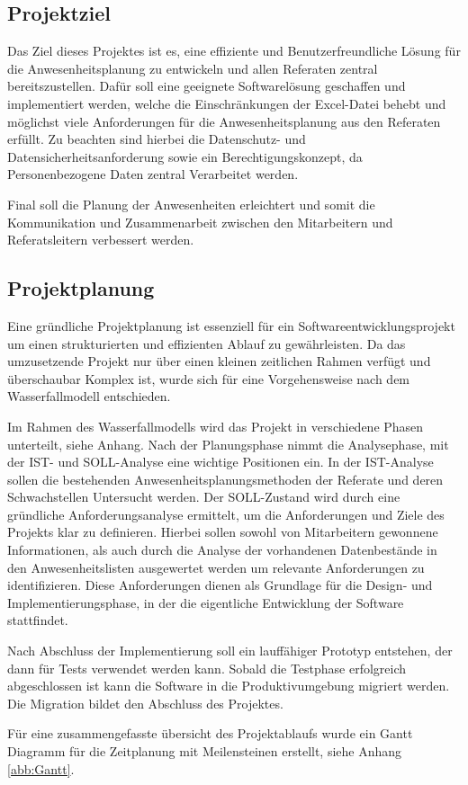 \subsection{Projektziel}
\label{sec:Projektziel}

Das Ziel dieses Projektes ist es, eine effiziente und Benutzerfreundliche Lösung für die Anwesenheitsplanung zu entwickeln und allen Referaten zentral bereitszustellen. Dafür soll eine geeignete Softwarelösung geschaffen und implementiert werden, welche die Einschränkungen der Excel-Datei behebt und möglichst viele Anforderungen für die Anwesenheitsplanung aus den Referaten erfüllt. Zu beachten sind hierbei die Datenschutz- und Datensicherheitsanforderung sowie ein Berechtigungskonzept, da Personenbezogene Daten zentral Verarbeitet werden.

Final soll die Planung der Anwesenheiten erleichtert und somit die Kommunikation und Zusammenarbeit zwischen den Mitarbeitern und Referatsleitern verbessert werden.

\subsection{Projektplanung}
\label{sec:Projektplanung}

Eine gründliche Projektplanung ist essenziell für ein Softwareentwicklungsprojekt um einen strukturierten und effizienten Ablauf zu gewährleisten. Da das umzusetzende Projekt nur über einen kleinen zeitlichen Rahmen verfügt und überschaubar Komplex ist, wurde sich für eine Vorgehensweise nach dem Wasserfallmodell entschieden.

Im Rahmen des Wasserfallmodells wird das Projekt in verschiedene Phasen unterteilt, siehe Anhang. Nach der Planungsphase nimmt die Analysephase, mit der IST- und SOLL-Analyse eine wichtige Positionen ein. In der IST-Analyse sollen die bestehenden Anwesenheitsplanungsmethoden der Referate und deren Schwachstellen Untersucht werden. Der SOLL-Zustand wird durch eine gründliche Anforderungsanalyse ermittelt, um die Anforderungen und Ziele des Projekts klar zu definieren. Hierbei sollen sowohl von Mitarbeitern gewonnene Informationen, als auch durch die Analyse der vorhandenen Datenbestände in den Anwesenheitslisten ausgewertet werden um relevante Anforderungen zu identifizieren. Diese Anforderungen dienen als Grundlage für die Design- und Implementierungsphase, in der die eigentliche Entwicklung der Software stattfindet.

Nach Abschluss der Implementierung soll ein lauffähiger Prototyp entstehen, der dann für Tests verwendet werden kann. Sobald die Testphase erfolgreich abgeschlossen ist kann die Software in die Produktivumgebung migriert werden. Die Migration bildet den Abschluss des Projektes.

Für eine zusammengefasste übersicht des Projektablaufs wurde ein Gantt Diagramm für die Zeitplanung mit Meilensteinen erstellt, siehe Anhang \ref{abb:Gantt}.

